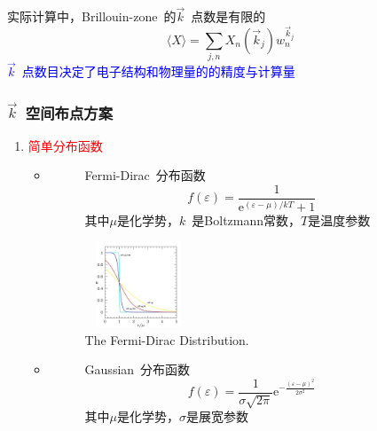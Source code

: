 {{实际计算中，\textrm{Brillouin-zone~}的$\vec k$~点数是有限的
\begin{displaymath}
	\langle X\rangle=\sum_{j,n}X_n(\vec k_j)w_n^{\vec k_j}
\end{displaymath} 
\textcolor{blue}{$\vec k$~点数目决定了电子结构和物理量的的精度与计算量}
}

\frame
{
\frametitle{$\vec k$~空间布点方案}
\begin{enumerate}
	\item \textcolor{red}{简单分布函数}\\
		\begin{itemize}
			\item 
				\begin{figure}[h!]
					\begin{minipage}[t]{0.40\linewidth}
						\textrm{Fermi-Dirac~}分布函数$$f(\varepsilon)=\dfrac1{\mathrm{e}^{(\varepsilon-\mu)/kT}+1}$$ 
						其中$\mu$是化学势，$k$~是\textrm{Boltzmann}常数，$T$是温度参数
					\end{minipage}
				\hfill
					\begin{minipage}[t]{0.55\linewidth}
					\centering
					\vspace*{-0.35in}
					\hspace*{-0.5in}
					\includegraphics[height=1.0in,width=1.25in,viewport=0 0 530 500,clip]{Figures/Fermi-Dirac-distribution.jpg}
					\caption{\textrm{The Fermi-Dirac Distribution.}}%
					\label{Fermi-Dirac-distribution}
					\end{minipage}
				\end{figure} 
			\item 
				\begin{figure}[h!]
					\begin{minipage}[t]{0.40\linewidth}
						\textrm{Gaussian~}分布函数$$f(\varepsilon)=\dfrac1{\sigma\sqrt{2\pi}}\mathrm{e}^{-\frac{(\varepsilon-\mu)^2}{2\sigma^2}}$$
						其中$\mu$是化学势，$\sigma$是展宽参数
					\end{minipage}
				\hfill
					\begin{minipage}[t]{0.55\linewidth}
					\centering
					\vspace*{-0.35in}
					\hspace*{-0.5in}

\end{minipage}
\end{figure}
\end{itemize}
\end{enumerate}}}
